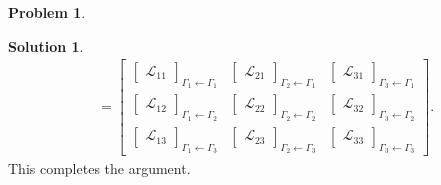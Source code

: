 \documentclass{book}
\theoremstyle{definition}
\newtheorem*{prob*}{Problem}
\newtheorem*{sln*}{Solution}
\newcommand{\lag}{\mathcal{L}}
\begin{document}
\begin{prob*}
\begin{sln*}
\begin{align*}
	&= \begin{bmatrix}
	\begin{bmatrix}
	\lag_{11}
	\end{bmatrix}_{\Gamma_1\leftarrow\Gamma_1}
	&
	\begin{bmatrix}
	\lag_{21}
	\end{bmatrix}_{\Gamma_2\leftarrow\Gamma_1}
	&
	\begin{bmatrix}
	\lag_{31}
	\end{bmatrix}_{\Gamma_3\leftarrow\Gamma_1}
	\\
	\begin{bmatrix}
	\lag_{12}
	\end{bmatrix}_{\Gamma_1\leftarrow\Gamma_2}
	&
	\begin{bmatrix}
	\lag_{22}
	\end{bmatrix}_{\Gamma_2\leftarrow\Gamma_2}
	&
	\begin{bmatrix}
	\lag_{32}
	\end{bmatrix}_{\Gamma_3\leftarrow\Gamma_2}
	\\
	\begin{bmatrix}
	\lag_{13}
	\end{bmatrix}_{\Gamma_1\leftarrow\Gamma_3}
	&
	\begin{bmatrix}
	\lag_{23}
	\end{bmatrix}_{\Gamma_2\leftarrow\Gamma_3}
	&
	\begin{bmatrix}
	\lag_{33}
	\end{bmatrix}_{\Gamma_3\leftarrow\Gamma_3}
	\end{bmatrix}.
	\end{align*}
	This completes the argument. \\
	

\end{sln*}
\end{prob*}
\end{document}
